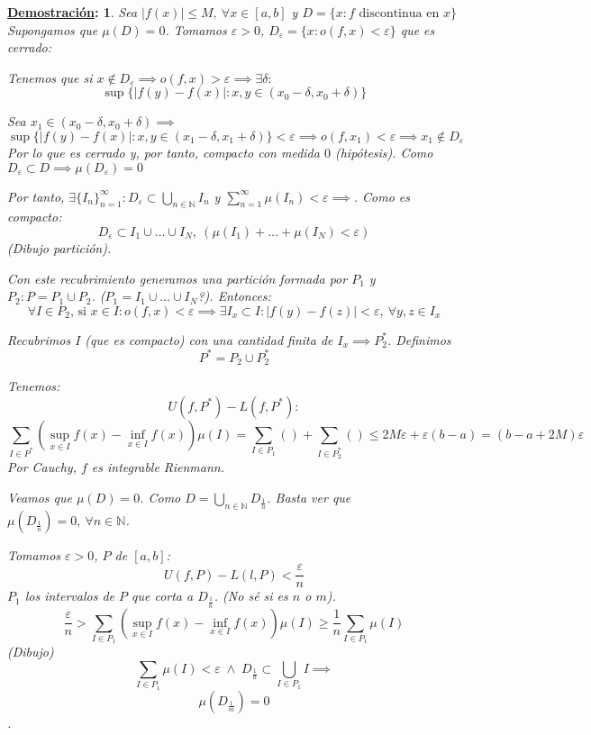 \documentclass[10pt,a4paper,openright]{book}
\theoremstyle{break}
\newtheorem*{demo}{\underline{Demostración}:}
\begin{document}
\begin{demo}
Sea $\vert f\left(x\right)\vert \le M,\ \forall x \in \left[a, b\right]$ y $D = \{x: f \text{ discontinua en } x\}$
Supongamos que $\mu\left(D\right) = 0$. Tomamos $\varepsilon > 0$, $D_{\varepsilon} = \{x: o\left(f, x\right) < \varepsilon\}$ que es cerrado:

Tenemos que si $x \not\in D_{\varepsilon} \implies o\left(f, x\right) > \varepsilon \implies \exists \delta:$
$$\sup \{ \vert f\left(y\right) - f\left(x\right) \vert: x, y \in \left(x_0 - \delta, x_0 + \delta \right) \}$$

Sea $x_1 \in \left(x_0 - \delta, x_0 + \delta \right) \implies$
$$\sup \{ \vert f\left(y\right) - f\left(x\right) \vert : x, y \in \left(x_1 - \delta, x_1 + \delta \right) \} < \varepsilon \implies o\left(f, x_1\right) < \varepsilon \implies x_1 \not\in D_{\varepsilon}$$
Por lo que es cerrado y, por tanto, compacto con medida $0$ (hipótesis).
Como $D_{\varepsilon} \subset D \implies \mu\left( D_{\varepsilon} \right) = 0$

Por tanto, $\exists \{I_n\}_{n=1}^{\infty}: D_{\varepsilon} \subset \bigcup_{n \in \mathbb{N}} I_n$ y $\sum_{n=1}^{\infty} \mu\left(I_n\right) < \varepsilon \implies$. Como es compacto:
$$D_{\varepsilon} \subset I_1 \cup \ldots \cup I_N,\ \left( \mu\left(I_1\right) + \ldots + \mu\left(I_N\right) < \varepsilon \right)$$
\textit{(Dibujo partición)}. 

Con este recubrimiento generamos una partición formada por $P_1$ y $P_2: P = P_1 \cup P_2$. ($P_1 = I_1 \cup \ldots \cup I_N$?). Entonces:
$$\forall I \in P_2 \text{, si } x \in I: o\left(f, x\right) < \varepsilon \implies \exists I_x \subset I: \vert f\left(y\right) - f\left(z\right) \vert < \varepsilon,\ \forall y, z \in I_x$$

Recubrimos $I$ (que es compacto) con una cantidad finita de $I_x \implies P_2^*$. Definimos 
$$P^* = P_2 \cup P_2^*$$

Tenemos:
$$U\left(f, P^* \right) - L\left(f, P^*\right) :$$
$$\sum_{I\in P^*} \left(\sup_{x \in I} f \left(x\right) - \inf_{x \in I} f\left(x\right) \right) \mu\left(I\right) = \sum_{I \in P_1} \left( \right) + \sum_{I \in P_2^*} \left( \right) \le 2M\varepsilon + \varepsilon\left(b - a\right) = \left(b - a + 2M\right) \varepsilon$$
Por Cauchy, $f$ es integrable Rienmann.

Veamos que $\mu\left(D\right) = 0$. Como $D = \bigcup_{n \in \mathbb{N}} D_{\frac{1}{n}}$. Basta ver que $\mu\left(D_{\frac{1}{n}}\right) = 0,\ \forall n \in \mathbb{N}$.

Tomamos $\varepsilon > 0$, $P$ de $\left[a, b\right]$:
$$U\left(f, P\right) - L\left(l, P\right) < \frac{\varepsilon}{n}$$
$P_1$ los intervalos de $P$ que corta a $D_{\frac{1}{n}}$. (No sé si es $n$ o $m$).
$$\frac{\varepsilon}{n} > \sum_{I \in P_1} \left(\sup_{x \in I} f\left(x\right) - \inf_{x \in I} f\left(x\right) \right) \mu\left(I\right) \ge \frac{1}{n} \sum_{I \in P_1} \mu\left(I\right)$$
(\textit{Dibujo}) 
$$\sum_{I \in P_1} \mu\left(I\right) < \varepsilon \; \land \; D_{\frac{1}{n}} \subset \bigcup_{I \in P_1} I \implies$$
$$\mu\left(D_{\frac{1}{m}}\right) = 0$$.
\end{demo}
\end{document}
